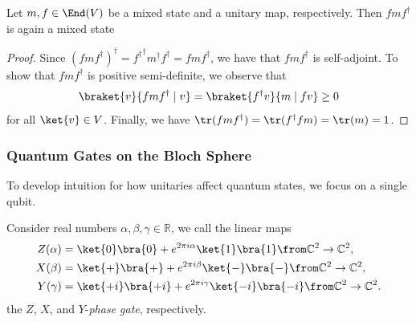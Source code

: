 \documentclass[a4paper,oneside, 12pt]{amsart}
\begin{document}
\begin{lemma}\label{lem:mixed-state-action}
  Let \(m, f\in \End(V)\) be a mixed state and a unitary map, respectively.
  Then \(fmf^{\dagger}\) is again a mixed state
\end{lemma}
\begin{proof}
  Since \((fmf^{\dagger})^{\dagger} = {f^{\dagger}}^{\dagger}m^{\dagger} f^{\dagger} = f m f^{\dagger}\), we have that \(fmf^{\dagger}\) is self-adjoint.
  To show that \(fmf^{\dagger}\) is positive semi-definite, we observe that
  \begin{equation*}
    \braket{v}{fmf^{\dagger} \mid v} = \braket{f^{\dagger } v}{m \mid f v} \geq 0
  \end{equation*}
  for all \(\ket{v}\in V\).
  Finally, we have \(\tr(fmf^{\dagger}) = \tr(f^{\dagger} f m ) = \tr(m) = 1\).
\end{proof}

\subsubsection{Quantum Gates on the Bloch Sphere}\label{sec:quantum-gates-on-the-bloch-sphere}
To develop intuition for how unitaries affect quantum states, we focus on a single qubit.

\begin{definition}\label{def:rotations-on-bloch-sphere}
  Consider real numbers \(\alpha, \beta,\gamma \in \mathbb{R}\), we call the linear maps
  \begin{subequations}
    \begin{align}
      Z(\alpha) &= \ket{0}\bra{0} + e^{2\pi i \alpha}\ket{1}\bra{1} \from \mathbb{C}^{2} \to \mathbb{C}^{2}, \\
      X(\beta) &= \ket{+}\bra{+} + e^{2\pi i \beta}\ket{-}\bra{-} \from \mathbb{C}^{2} \to \mathbb{C}^{2}, \\
      Y(\gamma) &= \ket{+i}\bra{+i} + e^{2\pi i \gamma}\ket{-i}\bra{-i} \from \mathbb{C}^{2}\to \mathbb{C}^{2}.
    \end{align}
  \end{subequations}
  the \(Z\), \(X\), and \(Y\)-\emph{phase gate}, respectively.
\end{definition}
\end{document}
